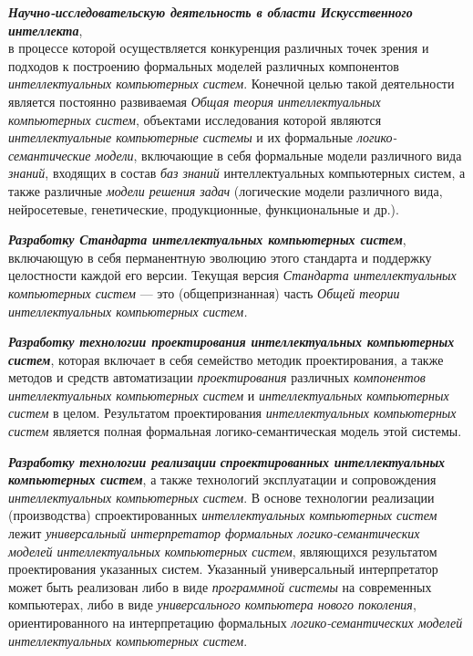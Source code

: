 \begin{textitemize}
	\item
	\textbf{\textit{Научно-исследовательскую деятельность в области Искусственного интеллекта}},\\
	в процессе которой осуществляется конкуренция различных точек зрения и подходов к построению формальных моделей различных компонентов \textit{интеллектуальных компьютерных систем}. Конечной целью такой деятельности является постоянно развиваемая \textit{Общая теория} \textit{интеллектуальных} \textit{компьютерных систем}, объектами исследования которой являются \textit{интеллектуальные компьютерные системы} и их формальные \textit{логико-семантические модели}, включающие в себя формальные модели различного вида \textit{знаний}, входящих в состав \textit{баз знаний} интеллектуальных компьютерных систем, а также различные \textit{модели решения задач} (логические модели различного вида, нейросетевые, генетические, продукционные, функциональные и др.).
	\item
	\textbf{\textit{Разработку Стандарта интеллектуальных компьютерных систем}}, включающую в себя перманентную эволюцию этого стандарта и поддержку целостности каждой его версии. Текущая версия \textit{Стандарта интеллектуальных компьютерных систем} --- это  (общепризнанная)  часть \textit{Общей теории интеллектуальных компьютерных систем.}
	\item
	\textbf{\textit{Разработку технологии проектирования интеллектуальных компьютерных систем}}, которая включает в себя семейство методик проектирования, а также методов и средств автоматизации \textit{проектирования} различных \textit{компонентов} \textit{интеллектуальных компьютерных систем} и \textit{интеллектуальных компьютерных систем} в целом. Результатом проектирования \textit{интеллектуальных компьютерных систем} является полная формальная логико-семантическая модель этой системы.
	\item
	\textbf{\textit{Разработку технологии реализации}} \textbf{\textit{спроектированных интеллектуальных компьютерных систем}}, а также технологий эксплуатации и сопровождения \textit{интеллектуальных компьютерных систем}. В основе технологии реализации (производства) спроектированных \textit{интеллектуальных компьютерных систем} лежит \textit{универсальный интерпретатор формальных логико-семантических моделей интеллектуальных компьютерных систем}, являющихся результатом проектирования указанных систем. Указанный универсальный интерпретатор может быть реализован либо в виде \textit{программной системы} на современных компьютерах, либо в виде \textit{универсального компьютера нового поколения}, ориентированного на интерпретацию формальных \textit{логико-семантических моделей интеллектуальных компьютерных систем}.

\end{textitemize}
